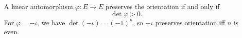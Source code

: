 A linear automorphism $\varphi: E \to E$ preserves the orientation if and only if
$$\det \varphi > 0.$$
For $\varphi = -\iota$, we have $\det(-\iota) = (-1)^n$, so $-\iota$ preserves orientation iff $n$ is even.
